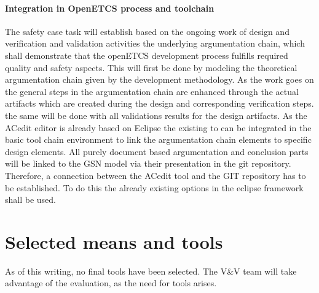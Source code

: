 \paragraph{Integration in OpenETCS process and toolchain}

The safety case task will establish based on the ongoing work of design and verification and validation activities the underlying argumentation chain, which shall demonstrate that the openETCS development process fulfills required quality and safety aspects. This will first be done by modeling the theoretical argumentation chain given by the development methodology. 
As the work goes on the general steps in the argumentation chain are enhanced through the actual artifacts which are created during the design and corresponding verification steps. the same will be done with all validations results for the design artifacts. 
As the ACedit editor is already based on Eclipse the existing to can be integrated in the basic tool chain environment to link the argumentation chain elements to specific design elements. All purely document based argumentation and conclusion parts will be linked to the GSN model via their presentation in the git repository. Therefore, a connection between the ACedit tool and the GIT repository has to be established. To do this the already existing options in the eclipse framework shall be used.


\section{Selected means and tools}

As of this writing, no final tools have been selected.  The V\&V team will take advantage of the evaluation, as the need for tools arises.
